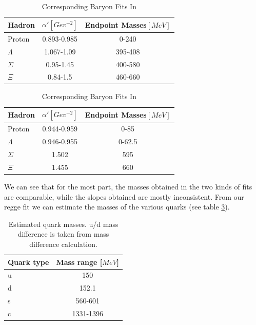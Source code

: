 \documentclass[11pt,a4paper]{article}
\begin{document}
\begin{table}
\centering
\begin{tabular}{|l|c|c|}
\hline
Hadron & $\alpha '\left[Gev^{-2}\right]$ & Endpoint Masses$\left[MeV\right]$ \\ \hline
Proton & 0.893-0.985 & 0-240 \\
$\Lambda$ & 1.067-1.09 & 395-408 \\
$\Sigma$ & 0.95-1.45 & 400-580 \\
$\Xi$  & 0.84-1.5 & 460-660 \\
\hline
\end{tabular}
\caption{Baryon Fits Summary Table. Endpoint mass is the same on both endpoints.}
\label{tab:baryonsum}

\centering
\begin{tabular}{|l|c|c|}
\hline
Hadron & $\alpha '\left[Gev^{-2}\right]$ & Endpoint Masses$\left[MeV\right]$ \\ \hline
Proton & 0.944-0.959 & 0-85 \\
$\Lambda$ & 0.946-0.955 & 0-62.5 \\
$\Sigma$ & 1.502 & 595 \\
$\Xi$  & 1.455 & 660 \\
\hline
\end{tabular}
\caption{Corresponding Baryon Fits In \cite{Sonnenschein15}}
\label{tab:baryonsumdorin}
\end{table}

We can see that for the most part, the masses obtained in the two kinds of fits are comparable, while the slopes obtained are mostly inconsistent. From our regge fit we can estimate the masses of the various quarks  (see table \ref{tab:quarkmasses}).

\begin{table}
\centering
\begin{tabular}{|l|c|}
\hline
Quark type & Mass range [$MeV$] \\ \hline
u & 150\\ \hline
d & 152.1 \\ \hline
s & 560-601\\ \hline
c & 1331-1396\\ \hline
\end{tabular}
\caption{Estimated quark masses. u/d mass difference is taken from mass difference calculation.}
\label{tab:quarkmasses}
\end{table}
\end{document}
